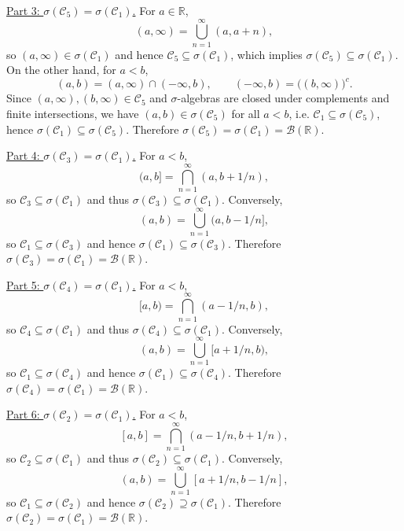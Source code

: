 \documentclass[letterpaper]{article}
\begin{document}
			\medskip
			\noindent\underline{Part 3: $\sigma(\mathcal{C}_5)=\sigma(\mathcal{C}_1)$.}
			For $a\in\mathbb{R}$,
			\[
			(a,\infty)=\bigcup_{n=1}^\infty (a,a+n),
			\]
			so $(a,\infty)\in\sigma(\mathcal{C}_1)$ and hence $\mathcal{C}_5\subseteq\sigma(\mathcal{C}_1)$,
			which implies $\sigma(\mathcal{C}_5)\subseteq\sigma(\mathcal{C}_1)$.
			On the other hand, for $a<b$,
			\[
			(a,b)=(a,\infty)\cap(-\infty,b),
			\qquad
			(-\infty,b)=\bigl((b,\infty)\bigr)^c.
			\]
			Since $(a,\infty),(b,\infty)\in\mathcal{C}_5$ and $\sigma$-algebras are closed under complements
			and finite intersections, we have $(a,b)\in\sigma(\mathcal{C}_5)$ for all $a<b$, i.e.
			$\mathcal{C}_1\subseteq\sigma(\mathcal{C}_5)$, hence $\sigma(\mathcal{C}_1)\subseteq\sigma(\mathcal{C}_5)$.
			Therefore $\sigma(\mathcal{C}_5)=\sigma(\mathcal{C}_1)=\mathcal{B}(\mathbb{R})$.
			
			\medskip
			\noindent\underline{Part 4: $\sigma(\mathcal{C}_3)=\sigma(\mathcal{C}_1)$.}
			For $a<b$,
			\[
			(a,b]=\bigcap_{n=1}^\infty (a,b+1/n),
			\]
			so $\mathcal{C}_3\subseteq\sigma(\mathcal{C}_1)$ and thus $\sigma(\mathcal{C}_3)\subseteq\sigma(\mathcal{C}_1)$.
			Conversely,
			\[
			(a,b)=\bigcup_{n=1}^\infty (a,b-1/n],
			\]
			so $\mathcal{C}_1\subseteq\sigma(\mathcal{C}_3)$ and hence $\sigma(\mathcal{C}_1)\subseteq\sigma(\mathcal{C}_3)$.
			Therefore $\sigma(\mathcal{C}_3)=\sigma(\mathcal{C}_1)=\mathcal{B}(\mathbb{R})$.
			
			\medskip
			\noindent\underline{Part 5: $\sigma(\mathcal{C}_4)=\sigma(\mathcal{C}_1)$.}
			For $a<b$,
			\[
			[a,b)=\bigcap_{n=1}^\infty (a-1/n,b),
			\]
			so $\mathcal{C}_4\subseteq\sigma(\mathcal{C}_1)$ and thus $\sigma(\mathcal{C}_4)\subseteq\sigma(\mathcal{C}_1)$.
			Conversely,
			\[
			(a,b)=\bigcup_{n=1}^\infty [a+1/n,b),
			\]
			so $\mathcal{C}_1\subseteq\sigma(\mathcal{C}_4)$ and hence $\sigma(\mathcal{C}_1)\subseteq\sigma(\mathcal{C}_4)$.
			Therefore $\sigma(\mathcal{C}_4)=\sigma(\mathcal{C}_1)=\mathcal{B}(\mathbb{R})$.
			
			\medskip
			\noindent\underline{Part 6: $\sigma(\mathcal{C}_2)=\sigma(\mathcal{C}_1)$.}
			For $a<b$,
			\[
			[a,b]=\bigcap_{n=1}^\infty (a-1/n,b+1/n),
			\]
			so $\mathcal{C}_2\subseteq\sigma(\mathcal{C}_1)$ and thus $\sigma(\mathcal{C}_2)\subseteq\sigma(\mathcal{C}_1)$.
			Conversely,
			\[
			(a,b)=\bigcup_{n=1}^\infty [a+1/n,b-1/n],
			\]
			so $\mathcal{C}_1\subseteq\sigma(\mathcal{C}_2)$ and hence $\sigma(\mathcal{C}_2)\supseteq\sigma(\mathcal{C}_1)$.
			Therefore $\sigma(\mathcal{C}_2)=\sigma(\mathcal{C}_1)=\mathcal{B}(\mathbb{R})$.
			
\end{document}
